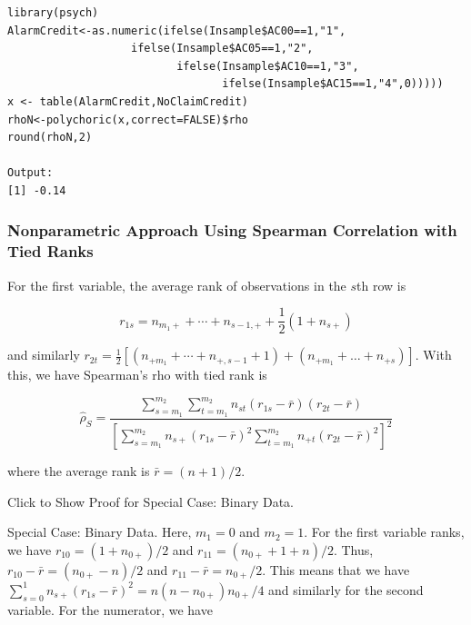 \documentclass[]{book}
\theoremstyle{definition}
\theoremstyle{definition}
\theoremstyle{definition}
\theoremstyle{remark}
\begin{document}
\hypertarget{display.poly.2}{}
\begin{verbatim}
library(psych)
AlarmCredit<-as.numeric(ifelse(Insample$AC00==1,"1",
                   ifelse(Insample$AC05==1,"2",
                          ifelse(Insample$AC10==1,"3",
                                 ifelse(Insample$AC15==1,"4",0)))))
x <- table(AlarmCredit,NoClaimCredit)
rhoN<-polychoric(x,correct=FALSE)$rho
round(rhoN,2)

Output:
[1] -0.14
\end{verbatim}

\subsubsection{Nonparametric Approach Using Spearman Correlation with
Tied
Ranks}\label{nonparametric-approach-using-spearman-correlation-with-tied-ranks}

For the first variable, the average rank of observations in the \(s\)th
row is

\begin{equation*}
r_{1s} = n_{m_1+}+ \cdots+ n_{s-1,+}+ \frac{1}{2} \left(1+ n_{s+}\right)
\end{equation*}

and similarly
\(r_{2t} = \frac{1}{2} \left[(n_{+m_1}+ \cdots+ n_{+,s-1}+1)+ (n_{+m_1}+ \ldots+ n_{+s})\right]\).
With this, we have Spearman's rho with tied rank is

\begin{equation*}
\hat{\rho}_S = \frac{\sum_{s=m_1}^{m_2} \sum_{t=m_1}^{m_2} n_{st}(r_{1s} - \bar{r})(r_{2t} - \bar{r})}
{\left[\sum_{s=m_1}^{m_2}n_{s+}(r_{1s} - \bar{r})^2 \sum_{t=m_1}^{m_2} n_{+t}(r_{2t} - \bar{r})^2
\right]^2}
\end{equation*}

where the average rank is \(\bar{r} = (n+1)/2\).

Click to Show Proof for Special Case: Binary Data.

\hypertarget{display.Thry.2}{}
Special Case: Binary Data. Here, \(m_1=0\) and \(m_2=1\). For the first
variable ranks, we have \(r_{10} = (1+n_{0+})/2\) and
\(r_{11} = (n_{0+}+1+n)/2\). Thus, \(r_{10} -\bar{r}= (n_{0+}-n)/2\) and
\(r_{11}-\bar{r} = n_{0+}/2\). This means that we have
\(\sum_{s=0}^{1}n_{s+}(r_{1s} - \bar{r})^2 = n (n-n_{0+})n_{0+}/4\) and
similarly for the second variable. For the numerator, we have
\end{document}
